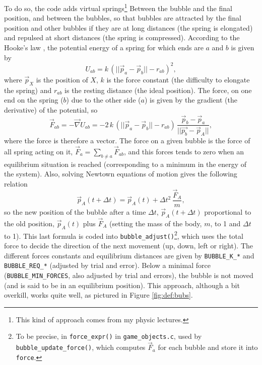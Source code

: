\documentclass[12pt,a4paper]{article}
\newcommand{\cc}[1]{\texttt{#1}}
\begin{document}
To do so, the code adds virtual springs\footnote{This kind of approach comes from my physic lectures.} Between the bubble and the final position, and between the bubbles, so that bubbles are attracted by the final position and other bubbles if they are at long distances (the spring is elongated) and repulsed at short distances (the spring is compressed). According to the Hooke's law \cite{hooke}, the potential energy of a spring for which ends are $a$ and $b$ is given by\begin{equation}
U_{ab} = k\,(||\vec{p}_a-\vec{p}_b||-r_{ab})^2,
\end{equation}
where $\vec{p}_X$ is the position of $X$, $k$ is the force constant (the difficulty to elongate the spring) and $r_{ab}$ is the resting distance (the ideal position). The force, on one end on the spring ($b$) due to the other side ($a$) is given by the gradient (the derivative) of the potential, so\begin{equation}
\vec{F}_{ab}  = - \vec{\nabla} U_{ab} =  -2\,k\,(||\vec{p}_a-\vec{p}_b||-r_{ab})\,\frac{\vec{p}_b-\vec{p}_a}{||\vec{p_b}-\vec{p}_A||},
\end{equation}
where the force is therefore a vector. The force on a given bubble is the force of all spring acting on it, $\vec{F}_a = \sum_{b\neq a} \vec{F}_{ab}$, and this forces tends to zero when an equilibrium situation is reached (corresponding to a minimum in the energy of the system). Also, solving Newtown equations of motion gives the following relation\begin{equation}
\vec{p}_A(t+\Delta{t}) = \vec{p}_A(t) + \Delta{t}^2\,\frac{\vec{F}_A}{m},\label{eq:1}
\end{equation}
so the new position of the bubble after a time $\Delta{t}$, $\vec{p}_A(t+\Delta{t})$ proportional to the old position, $\vec{p}_A(t)$ plus $\vec{F}_A$ (setting the mass of the body, $m$, to 1 and $\Delta{t}$ to 1). This last formula is coded into \cc{bubble_adjust()}\footnote{To be precise, in \cc{force_expr()} in \texttt{game\_objects.c}, used by \cc{bubble_update_force()}, which computes $\vec{F}_{a}$ for each bubble and store it into \cc{force}.}, which uses the total force to decide the direction of the next movement (up, down, left or right). The different forces constants and equilibrium distances are given by \cc{BUBBLE_K_*} and \cc{BUBBLE_REQ_*} (adjusted by trial and error). Below a minimal force (\cc{BUBBLE_MIN_FORCES}, also adjusted by trial and errors), the bubble is not moved (and is said to be in an equilibrium position). This approach, although a bit overkill, works quite well, as pictured in Figure \ref{fig:def:bubs}.
\end{document}
